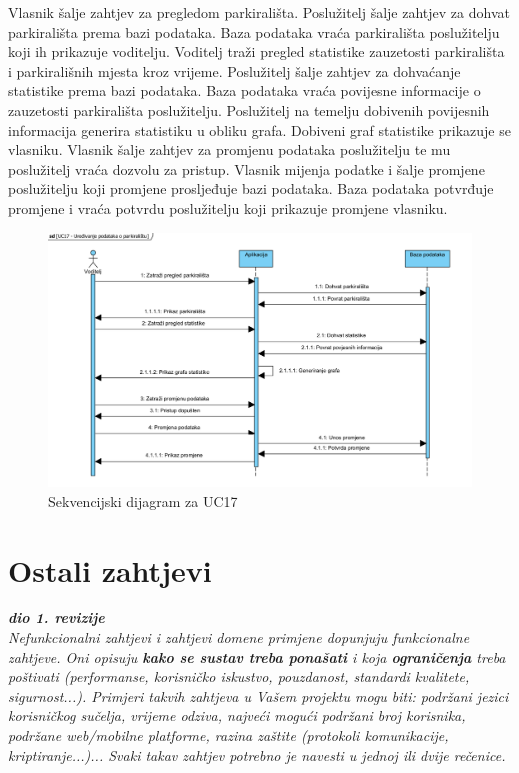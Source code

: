 				Vlasnik šalje zahtjev za pregledom parkirališta. Poslužitelj šalje zahtjev za dohvat parkirališta prema bazi podataka. Baza podataka vraća parkirališta poslužitelju koji ih prikazuje voditelju. Voditelj traži pregled statistike zauzetosti parkirališta i parkirališnih mjesta kroz vrijeme. Poslužitelj šalje zahtjev za dohvaćanje statistike prema bazi podataka. Baza podataka vraća povijesne informacije o zauzetosti parkirališta poslužitelju. Poslužitelj na temelju dobivenih povijesnih informacija generira statistiku u obliku grafa. Dobiveni graf statistike prikazuje se vlasniku. Vlasnik šalje zahtjev za promjenu podataka poslužitelju te mu poslužitelj vraća dozvolu za pristup. Vlasnik mijenja podatke i šalje promjene poslužitelju koji promjene prosljeđuje bazi podataka. Baza podataka potvrđuje promjene i vraća potvrdu poslužitelju koji prikazuje promjene vlasniku.
				
				\vspace{1cm}
				
				\begin{figure}[H]
					\centering
					\includegraphics[width=\textwidth]{slike/SD_UC17.JPG} 
					\caption{Sekvencijski dijagram za UC17}
					\label{fig:promjene11} 
				\end{figure}

				\eject
	
		\section{Ostali zahtjevi}
		
			\textbf{\textit{dio 1. revizije}}\\
		 
			 \textit{Nefunkcionalni zahtjevi i zahtjevi domene primjene dopunjuju funkcionalne zahtjeve. Oni opisuju \textbf{kako se sustav treba ponašati} i koja \textbf{ograničenja} treba poštivati (performanse, korisničko iskustvo, pouzdanost, standardi kvalitete, sigurnost...). Primjeri takvih zahtjeva u Vašem projektu mogu biti: podržani jezici korisničkog sučelja, vrijeme odziva, najveći mogući podržani broj korisnika, podržane web/mobilne platforme, razina zaštite (protokoli komunikacije, kriptiranje...)... Svaki takav zahtjev potrebno je navesti u jednoj ili dvije rečenice.}

